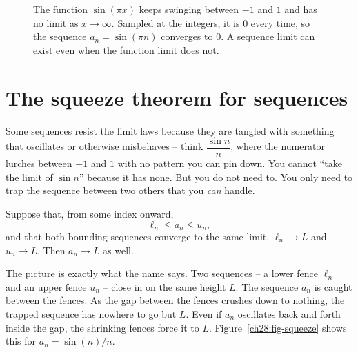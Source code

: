 \begin{figure}[htbp]
\centering
{}
\caption{The function $\sin(\pi x)$ keeps swinging between $-1$ and $1$ and has
no limit as $x \to \infty$. Sampled at the integers, it is $0$ every time, so
the sequence $a_n = \sin(\pi n)$ converges to $0$. A sequence limit can exist
even when the function limit does not.}
\label{ch28:fig-sampling}
\end{figure}

\section{The squeeze theorem for sequences}
\label{ch28:squeeze}

Some sequences resist the limit laws because they are tangled with something
that oscillates or otherwise misbehaves -- think $\dfrac{\sin n}{n}$, where the
numerator lurches between $-1$ and $1$ with no pattern you can pin down. You
cannot ``take the limit of $\sin n$'' because it has none. But you do not need
to. You only need to trap the sequence between two others that you \emph{can}
handle.

\begin{theorem}
\label{ch28:thm-squeeze}
Suppose that, from some index onward,
\[
  \ell_n \le a_n \le u_n,
\]
and that both bounding sequences converge to the same limit, $\ell_n \to L$ and
$u_n \to L$. Then $a_n \to L$ as well.
\end{theorem}

\begin{intuitionbox}
The picture is exactly what the name says. Two sequences -- a lower fence
$\ell_n$ and an upper fence $u_n$ -- close in on the same height $L$. The
sequence $a_n$ is caught between the fences. As the gap between the fences
crushes down to nothing, the trapped sequence has nowhere to go but $L$. Even if
$a_n$ oscillates back and forth inside the gap, the shrinking fences force it to $L$.
Figure~\ref{ch28:fig-squeeze} shows this for $a_n = \sin(n)/n$.
\end{intuitionbox}


